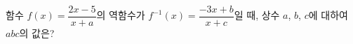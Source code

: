 함수 $f(x)=\dfrac{2x-5}{x+a}$의 역함수가 $f^{-1}(x)=\dfrac{-3x+b}{x+c}$일 때, 상수 $a$, $b$, $c$에 대하여 $abc$의 값은?
